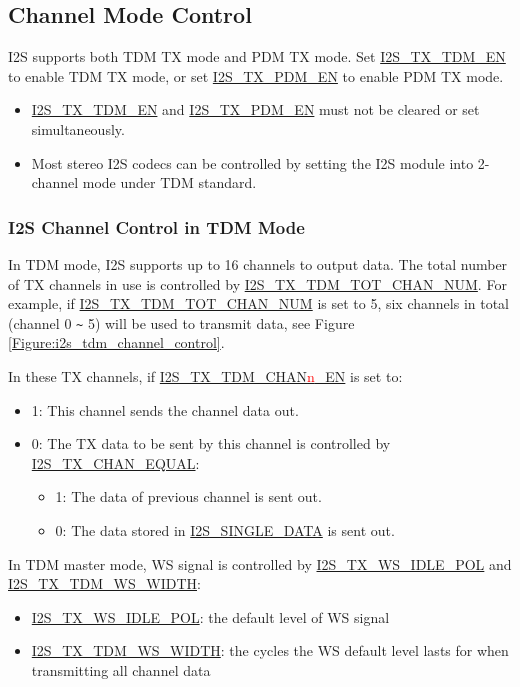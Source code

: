 \documentclass[main\_\_CN.tex]{subfiles}
\begin{document}
\subsection{Channel Mode Control}
\chipname{} I2S supports both TDM TX mode and PDM TX mode. Set  \hyperref[fielddesc:I2STXTDMEN]{I2S\_TX\_TDM\_EN} to enable TDM TX mode, or set  \hyperref[fielddesc:I2STXPDMEN]{I2S\_TX\_PDM\_EN} to enable PDM TX mode.

\begin{tiplisting}
\vspace{-2em}
\begin{itemize}
    \item \hyperref[fielddesc:I2STXTDMEN]{I2S\_TX\_TDM\_EN} and \hyperref[fielddesc:I2STXPDMEN]{I2S\_TX\_PDM\_EN} must not be cleared or set simultaneously.
    \item Most stereo I2S codecs can be controlled by setting the I2S module into 2-channel mode under TDM standard.
    \end{itemize}
\end{tiplisting}

\subsubsection{I2S Channel Control in TDM Mode} \label{sec:tdm-channel-mode}
In TDM mode, I2S supports up to 16 channels to output data. The total number of TX channels in use is controlled by  \hyperref[fielddesc:I2STXTDMTOTCHANNUM]{I2S\_TX\_TDM\_TOT\_CHAN\_NUM}. For example, if  \hyperref[fielddesc:I2STXTDMTOTCHANNUM]{I2S\_TX\_TDM\_TOT\_CHAN\_NUM} is set to 5, six channels in total (channel 0 \verb+~+ 5) will be used to transmit data, see Figure
\ref{Figure:i2s_tdm_channel_control}.

In these TX channels, if  \hyperref[fielddesc:I2STXTDMCHAN0EN]{I2S\_TX\_TDM\_CHAN{\textcolor{red}{n}}\_EN} is set to:
\begin{itemize}
    \item 1: This channel sends the channel data out.
    \item 0: The TX data to be sent by this channel is controlled by  \hyperref[fielddesc:I2STXCHANEQUAL]{I2S\_TX\_CHAN\_EQUAL}:
    \begin{itemize}
        \item 1: The data of previous channel is sent out.
        \item 0: The data stored in  \hyperref[fielddesc:I2SSINGLEDATA]{I2S\_SINGLE\_DATA} is sent out.
    \end{itemize}
\end{itemize}
In TDM master mode, WS signal is controlled by \hyperref[fielddesc:I2STXWSIDLEPOL]{I2S\_TX\_WS\_IDLE\_POL} and  \hyperref[fielddesc:I2STXTDMWSWIDTH]{I2S\_TX\_TDM\_WS\_WIDTH}: \begin{itemize}
\item \hyperref[fielddesc:I2STXWSIDLEPOL]{I2S\_TX\_WS\_IDLE\_POL}: the default level of WS signal
\item \hyperref[fielddesc:I2STXTDMWSWIDTH]{I2S\_TX\_TDM\_WS\_WIDTH}: the cycles the WS default level lasts for when transmitting all channel data  \end{itemize}
\end{document}
